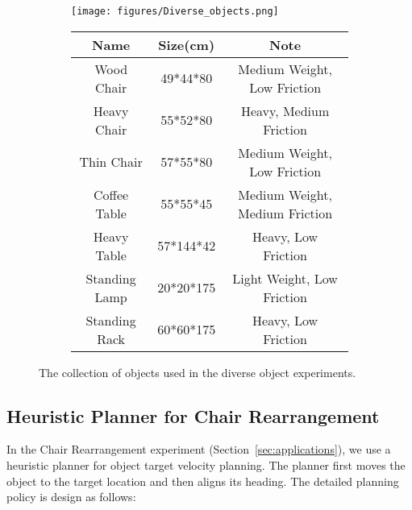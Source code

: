 \begin{figure}[H]
\centering


\begin{subfigure}{\linewidth}
\centering
\texttt{[image: figures/Diverse\_objects.png]}
\end{subfigure}%
\vspace{.25cm}

\begin{subfigure}{\linewidth}
\centering

\begin{tabular}{c | c | c }

\toprule
\rowcolor[HTML]{ededed}
Name&  Size(cm) & Note\\
\midrule
Wood Chair & 49*44*80 &  Medium Weight, Low Friction \\
\midrule
Heavy Chair &  55*52*80 &  Heavy, Medium Friction  \\
\midrule
Thin Chair &  57*55*80 &  Medium Weight, Low Friction  \\
\midrule
Coffee Table &  55*55*45 &  Medium Weight, Medium Friction  \\
\midrule
Heavy Table &   57*144*42 &  Heavy, Low Friction  \\
\midrule
Standing Lamp &  20*20*175 &  Light Weight, Low Friction  \\
\midrule
Standing Rack & 60*60*175 & Heavy, Low Friction \\
\bottomrule


\end{tabular}

\end{subfigure}
\caption{The collection of objects used in the diverse object experiments.}
\label{fig:diverse}
\end{figure}

\subsection{Heuristic Planner for Chair Rearrangement}
\label{app:heuristic_planner}
In the Chair Rearrangement experiment (Section~\ref{sec:applications}), we use a heuristic planner for object target velocity planning. The planner first moves the object to the target location and then aligns its heading. The detailed planning policy is design as follows:



